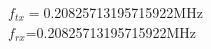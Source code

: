 \documentclass[preview]{standalone}
\begin{document}
\begin{center}
$f_{tx}=$0.20825713195715922MHz\\$f_{rx}$=0.20825713195715922MHz
\end{center}
\end{document}
